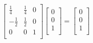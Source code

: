 \documentclass{article}
\begin{document}
\begin{equation}
 \left[
 \begin{array}{ccc}
   \frac{1}{4}&\frac{1}{4}&0\\
   -\frac{1}{2}&\frac{1}{2}&0\\
   0&0&1\\
 \end{array}\right]
 \left[
 \begin{array}{c}
   0\\
   0\\
   1\\
 \end{array}\right]
 =\left[
 \begin{array}{c}
   0\\
   0\\
   1\\
 \end{array}\right]
\end{equation}
\end{document}

